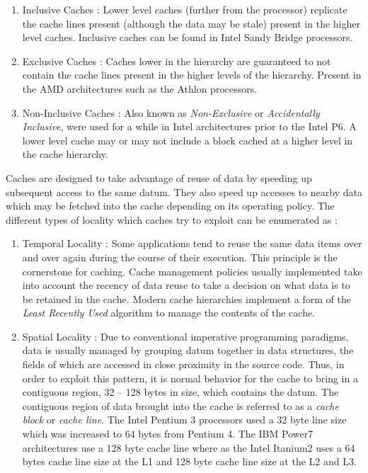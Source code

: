 \begin{enumerate}
  \item Inclusive Caches : Lower level caches (further from the processor) replicate the cache lines present (although the data may be stale) present in the higher level caches. Inclusive caches can be found in Intel Sandy Bridge processors.
  \item Exclusive Caches : Caches lower in the hierarchy are guaranteed to not contain the cache lines present in the higher levels of the hierarchy. Present in the AMD architectures such as the Athlon processors.
  \item Non-Inclusive Caches : Also known as \textit{Non-Exclusive} or \textit{Accidentally Inclusive}, were used for a while in Intel architectures prior to the Intel P6. A lower level cache may or may not include a block cached at a higher level in the cache hierarchy.
\end{enumerate}

Caches are designed to take advantage of reuse of data by speeding up subsequent access to the same datum. They also speed up accesses to nearby data which may be fetched into the cache depending on its operating policy. The different types of locality which caches try to exploit can be enumerated as :

\begin{enumerate}
  \item Temporal Locality : Some applications tend to reuse the same data items over and over again during the course of their execution. This principle is the cornerstone for caching. Cache management policies usually implemented take into account the recency of data reuse to take a decision on what data is to be retained in the cache. Modern cache hierarchies implement a form of the \textit{Least Recently Used} algorithm to manage the contents of the cache.
  \item Spatial Locality : Due to conventional imperative programming paradigms, data is usually managed by grouping datum together in data structures, the fields of which are accessed in close proximity in the source code. Thus, in order to exploit this pattern, it is normal behavior for the cache to bring in a contiguous region, 32 -- 128 bytes in size, which contains the datum. The contiguous region of data brought into the cache is referred to as a \textit{cache block} or \textit{cache line}. The Intel Pentium 3 processors used a 32 byte line size which was increased to 64 bytes from Pentium 4. The IBM Power7 architectures use a 128 byte cache line where as the Intel Itanium2 uses a 64 bytes cache line size at the L1 and 128 byte cache line size at the L2 and L3.
\end{enumerate}

